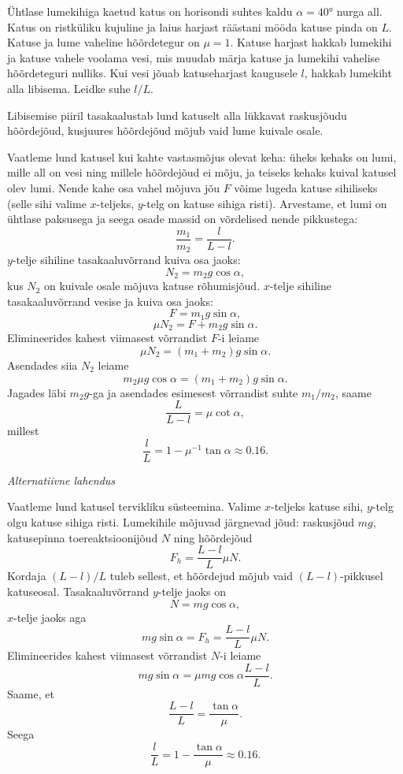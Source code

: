
Ühtlase lumekihiga kaetud katus on horisondi suhtes kaldu $\alpha = \ang{40}$ nurga all. Katus on ristküliku kujuline ja laius harjast räästani mööda katuse pinda on $L$. Katuse ja lume vaheline hõõrdetegur on $\mu = \num{1}$. Katuse harjast hakkab lumekihi ja katuse vahele voolama vesi, mis muudab märja katuse ja lumekihi vahelise hõõrdeteguri nulliks. Kui vesi jõuab katuseharjast kaugusele $l$, hakkab lumekiht alla libisema. Leidke suhe $l/L$.

\hint
Libisemise piiril tasakaalustab lund katuselt alla lükkavat raskusjõudu hõõrdejõud, kusjuures hõõrdejõud mõjub vaid lume kuivale osale.

\solu
Vaatleme lund katusel kui kahte vastasmõjus olevat keha: üheks kehaks on lumi, mille all on vesi ning millele hõõrdejõud ei mõju, ja teiseks kehaks kuival katusel olev lumi. Nende kahe osa vahel mõjuva jõu $F$ võime lugeda katuse sihiliseks (selle sihi valime $x$-teljeks, $y$-telg on katuse sihiga risti). Arvestame, et lumi on ühtlase paksusega ja seega osade massid on võrdelised nende pikkustega: 
\[
\frac{m_1}{m_2} = \frac{l}{L-l}.
\]
$y$-telje sihiline tasakaaluvõrrand kuiva osa jaoks:
\[
N_2 = m_2g \cos \alpha,
\]
kus $N_2$ on kuivale osale mõjuva katuse rõhumisjõud. $x$-telje sihiline tasakaaluvõrrand vesise ja kuiva osa jaoks:
\[
F = m_1g \sin \alpha,
\]
\[
\mu N_2 = F + m_2g \sin \alpha.
\]
Elimineerides kahest viimasest võrrandist $F$-i leiame
\[
\mu N_2 = (m_1 + m_2) g \sin \alpha.
\]
Asendades siia $N_2$ leiame
\[
m_2\mu g \cos \alpha = (m_1 + m_2) g \sin \alpha.
\]
Jagades läbi $m_2g$-ga ja asendades esimesest võrrandist suhte $m_1/m_2$, saame
\[
\frac{L}{L-l}=\mu \cot \alpha,
\]
millest
\[
\frac{l}{L}=1-\mu^{-1} \tan \alpha \approx \num{0,16}.
\]

\vspace{0.5\baselineskip}

\emph{Alternatiivne lahendus}

Vaatleme lund katusel tervikliku süsteemina. Valime $x$-teljeks katuse sihi, $y$-telg olgu katuse sihiga risti. Lumekihile mõjuvad järgnevad jõud: raskusjõud $mg$, katusepinna toereaktsioonijõud $N$ ning hõõrdejõud
\[
F_h = \frac{L-l}{L} \mu N.
\]
Kordaja $(L-l)/L$ tuleb sellest, et hõõrdejud mõjub vaid $(L-l)$-pikkusel katuseosal.
Tasakaaluvõrrand $y$-telje jaoks on
\[
N = mg \cos \alpha,
\]
$x$-telje jaoks aga
\[
m g \sin \alpha=F_{h}=\frac{L-l}{L} \mu N.
\]
Elimineerides kahest viimasest võrrandist $N$-i leiame
\[
m g \sin \alpha=\mu m g \cos \alpha \frac{L-l}{L}.
\]
Saame, et
\[
\frac{L-l}{L} = \frac{\tan\alpha}{\mu}.
\]
Seega
\[
\frac{l}{L}=1-\frac{\tan \alpha}{\mu} \approx \num{0,16}.
\]
\probend
